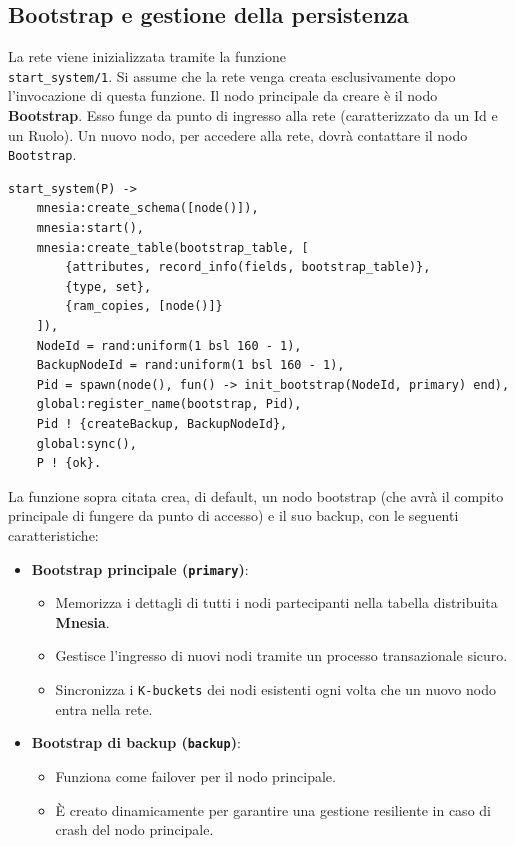 \documentclass{article}
\begin{document}
\subsection{Bootstrap e gestione della persistenza}
La rete viene inizializzata tramite la funzione \\ \texttt{start\_system/1}. Si assume che la rete venga creata esclusivamente dopo l'invocazione di questa funzione. Il nodo principale da creare è il nodo \textbf{Bootstrap}. Esso funge da punto di ingresso alla rete (caratterizzato da un Id e un Ruolo). Un nuovo nodo, per accedere alla rete, dovrà contattare il nodo \texttt{Bootstrap}.
\begin{lstlisting}
start_system(P) ->
    mnesia:create_schema([node()]),
    mnesia:start(),
    mnesia:create_table(bootstrap_table, [
        {attributes, record_info(fields, bootstrap_table)},
        {type, set},
        {ram_copies, [node()]}
    ]),
    NodeId = rand:uniform(1 bsl 160 - 1),
    BackupNodeId = rand:uniform(1 bsl 160 - 1),
    Pid = spawn(node(), fun() -> init_bootstrap(NodeId, primary) end),
    global:register_name(bootstrap, Pid),
    Pid ! {createBackup, BackupNodeId},
    global:sync(),
    P ! {ok}.
\end{lstlisting}
La funzione sopra citata crea, di default, un nodo bootstrap (che avrà il compito principale di fungere da punto di accesso) e il suo backup, con le seguenti caratteristiche:
\begin{itemize}
    \item \textbf{Bootstrap principale (\texttt{primary})}:
    \begin{itemize}
        \item Memorizza i dettagli di tutti i nodi partecipanti nella tabella distribuita \textbf{Mnesia}.
        \item Gestisce l'ingresso di nuovi nodi tramite un processo transazionale sicuro.
        \item Sincronizza i \texttt{K-buckets} dei nodi esistenti ogni volta che un nuovo nodo entra nella rete.
    \end{itemize}
    \item \textbf{Bootstrap di backup (\texttt{backup})}:
    \begin{itemize}
        \item Funziona come failover per il nodo principale.
        \item È creato dinamicamente per garantire una gestione resiliente in caso di crash del nodo principale.
    \end{itemize}
\end{itemize}
\end{document}
